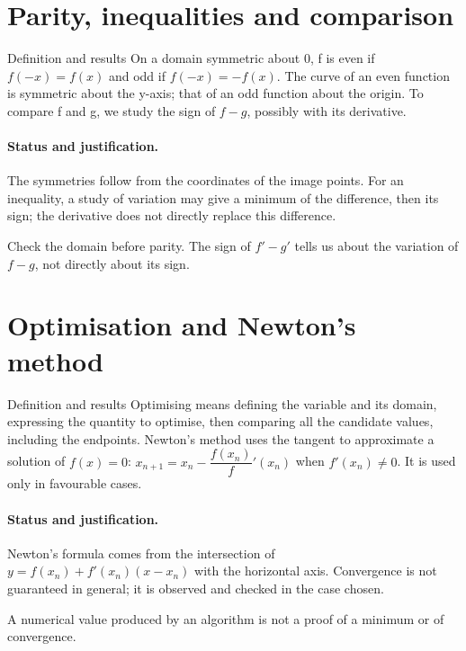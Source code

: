 \section{Parity, inequalities and comparison}\label{C06-U4}
\begin{repere}{Definition and results}
On a domain symmetric about 0, f is even if $f(-x)=f(x)$ and odd if $f(-x)=-f(x)$. The curve of an even function is symmetric about the y-axis; that of an odd function about the origin. To compare f and g, we study the sign of $f-g$, possibly with its derivative.
\end{repere}
\paragraph{Status and justification.} The symmetries follow from the coordinates of the image points. For an inequality, a study of variation may give a minimum of the difference, then its sign; the derivative does not directly replace this difference.
\label{C06-EX4}
\begin{erreur}Check the domain before parity. The sign of $f\prime-g\prime$ tells us about the variation of $f-g$, not directly about its sign.\end{erreur}
\label{C06-AP4}
\section{Optimisation and Newton's method}\label{C06-U5}
\begin{repere}{Definition and results}
Optimising means defining the variable and its domain, expressing the quantity to optimise, then comparing all the candidate values, including the endpoints. Newton's method uses the tangent to approximate a solution of $f(x)=0$: $x_{n+1}=x_n-\dfrac{f(x_n)}{f}\prime (x_n)$ when $f\prime(x_n)\ne0$. It is used only in favourable cases.
\end{repere}
\paragraph{Status and justification.} Newton's formula comes from the intersection of $y=f(x_n)+f\prime(x_n)(x-x_n)$ with the horizontal axis. Convergence is not guaranteed in general; it is observed and checked in the case chosen.
\label{C06-EX5}
\begin{erreur}A numerical value produced by an algorithm is not a proof of a minimum or of convergence.\end{erreur}
\clearpage
{}\label{C06-AP5}
